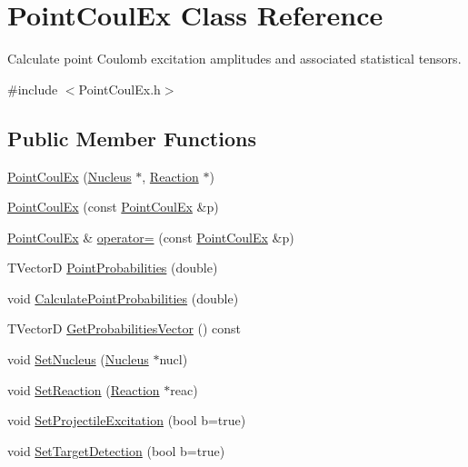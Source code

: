 \hypertarget{classPointCoulEx}{\section{Point\-Coul\-Ex Class Reference}
\label{classPointCoulEx}
}


Calculate point Coulomb excitation amplitudes and associated statistical tensors.  




{\ttfamily \#include $<$Point\-Coul\-Ex.\-h$>$}

\subsection*{Public Member Functions}
\begin{DoxyCompactItemize}
\item 
\hyperlink{classPointCoulEx_a9246400fa6440b3628cdb3010e733f3c}{Point\-Coul\-Ex} (\hyperlink{classNucleus}{Nucleus} $\ast$, \hyperlink{classReaction}{Reaction} $\ast$)
\item 
\hyperlink{classPointCoulEx_ae304214fe53d62d39b1413bf179bd0bd}{Point\-Coul\-Ex} (const \hyperlink{classPointCoulEx}{Point\-Coul\-Ex} \&p)
\item 
\hyperlink{classPointCoulEx}{Point\-Coul\-Ex} \& \hyperlink{classPointCoulEx_ac812c4e40026a7becd63c583b63aaf43}{operator=} (const \hyperlink{classPointCoulEx}{Point\-Coul\-Ex} \&p)
\item 
T\-Vector\-D \hyperlink{classPointCoulEx_ae3636eacee3ab0f37d0b8c927d779387}{Point\-Probabilities} (double)
\item 
void \hyperlink{classPointCoulEx_a350a143e891ac63bb7088559a20081dc}{Calculate\-Point\-Probabilities} (double)
\item 
T\-Vector\-D \hyperlink{classPointCoulEx_a7af998470e383eb70c74c3dae33a85b6}{Get\-Probabilities\-Vector} () const 
\item 
void \hyperlink{classPointCoulEx_a8e109cc21be7be0abb69fb561bab4dcf}{Set\-Nucleus} (\hyperlink{classNucleus}{Nucleus} $\ast$nucl)
\item 
void \hyperlink{classPointCoulEx_a2b3413601d938ca86e6ccf0aa8e09f37}{Set\-Reaction} (\hyperlink{classReaction}{Reaction} $\ast$reac)
\item 
void \hyperlink{classPointCoulEx_aea871d21af150c2ca49c95be891bc717}{Set\-Projectile\-Excitation} (bool b=true)
\item 
void \hyperlink{classPointCoulEx_a547911f31b59fb1e3d5bb9492e097422}{Set\-Target\-Detection} (bool b=true)

\end{DoxyCompactItemize}
